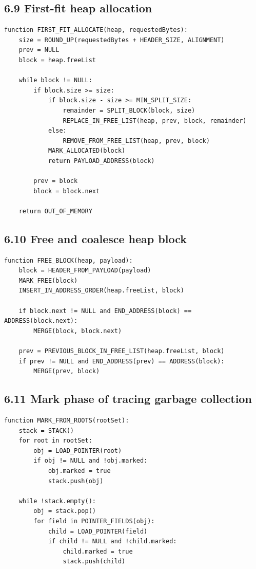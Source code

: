 \documentclass[10pt,letterpaper]{article}
\begin{document}
\subsection*{6.9 First-fit heap allocation}

\begin{verbatim}
function FIRST_FIT_ALLOCATE(heap, requestedBytes):
    size = ROUND_UP(requestedBytes + HEADER_SIZE, ALIGNMENT)
    prev = NULL
    block = heap.freeList

    while block != NULL:
        if block.size >= size:
            if block.size - size >= MIN_SPLIT_SIZE:
                remainder = SPLIT_BLOCK(block, size)
                REPLACE_IN_FREE_LIST(heap, prev, block, remainder)
            else:
                REMOVE_FROM_FREE_LIST(heap, prev, block)
            MARK_ALLOCATED(block)
            return PAYLOAD_ADDRESS(block)

        prev = block
        block = block.next

    return OUT_OF_MEMORY
\end{verbatim}

\subsection*{6.10 Free and coalesce heap block}

\begin{verbatim}
function FREE_BLOCK(heap, payload):
    block = HEADER_FROM_PAYLOAD(payload)
    MARK_FREE(block)
    INSERT_IN_ADDRESS_ORDER(heap.freeList, block)

    if block.next != NULL and END_ADDRESS(block) == ADDRESS(block.next):
        MERGE(block, block.next)

    prev = PREVIOUS_BLOCK_IN_FREE_LIST(heap.freeList, block)
    if prev != NULL and END_ADDRESS(prev) == ADDRESS(block):
        MERGE(prev, block)
\end{verbatim}

\subsection*{6.11 Mark phase of tracing garbage collection}

\begin{verbatim}
function MARK_FROM_ROOTS(rootSet):
    stack = STACK()
    for root in rootSet:
        obj = LOAD_POINTER(root)
        if obj != NULL and !obj.marked:
            obj.marked = true
            stack.push(obj)

    while !stack.empty():
        obj = stack.pop()
        for field in POINTER_FIELDS(obj):
            child = LOAD_POINTER(field)
            if child != NULL and !child.marked:
                child.marked = true
                stack.push(child)
\end{verbatim}
\end{document}
